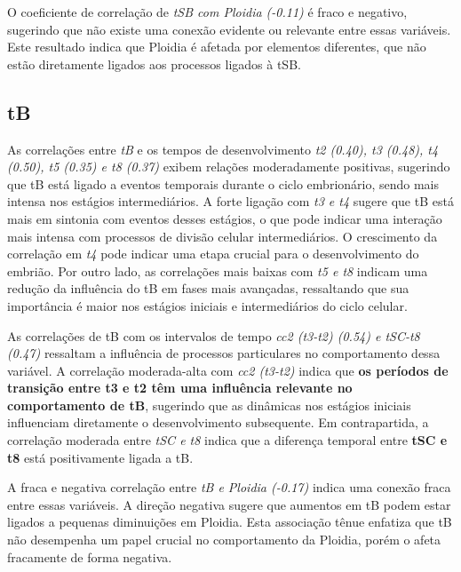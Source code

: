 O coeficiente de correlação de \textit{tSB com Ploidia (-0.11)} é fraco e negativo, sugerindo que não existe uma conexão evidente ou relevante entre essas variáveis. Este resultado indica que Ploidia é afetada por elementos diferentes, que não estão diretamente ligados aos processos ligados à tSB.

\subsection*{tB}
As correlações entre \textit{tB} e os tempos de desenvolvimento \textit{t2 (0.40), t3 (0.48), t4 (0.50), t5 (0.35) e t8 (0.37)} exibem relações moderadamente positivas, sugerindo que tB está ligado a eventos temporais durante o ciclo embrionário, sendo mais intensa nos estágios intermediários. A forte ligação com \textit{t3 e t4} sugere que tB está mais em sintonia com eventos desses estágios, o que pode indicar uma interação mais intensa com processos de divisão celular intermediários. O crescimento da correlação em \textit{t4} pode indicar uma etapa crucial para o desenvolvimento do embrião. Por outro lado, as correlações mais baixas com \textit{t5 e t8} indicam uma redução da influência do tB em fases mais avançadas, ressaltando que sua importância é maior nos estágios iniciais e intermediários do ciclo celular.

As correlações de tB com os intervalos de tempo \textit{cc2 (t3-t2) (0.54) e tSC-t8 (0.47)} ressaltam a influência de processos particulares no comportamento dessa variável. A correlação moderada-alta com \textit{cc2 (t3-t2)} indica que \textbf{os períodos de transição entre t3 e t2 têm uma influência relevante no comportamento de tB}, sugerindo que as dinâmicas nos estágios iniciais influenciam diretamente o desenvolvimento subsequente. Em contrapartida, a correlação moderada entre \textit{tSC e t8} indica que a diferença temporal entre \textbf{tSC e t8} está positivamente ligada a tB. 

A fraca e negativa correlação entre \textit{tB e Ploidia (-0.17)} indica uma conexão fraca entre essas variáveis. A direção negativa sugere que aumentos em tB podem estar ligados a pequenas diminuições em Ploidia. Esta associação tênue enfatiza que tB não desempenha um papel crucial no comportamento da Ploidia, porém o afeta fracamente de forma negativa.

